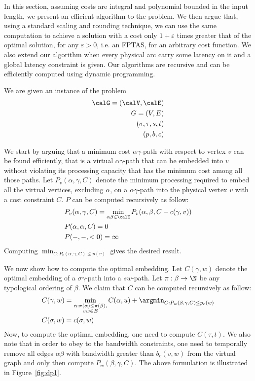 In this section, 
assuming costs are integral and polynomial bounded in the input length,
we present an efficient algorithm to the \VPN{} problem.
We then argue that, using a standard scaling and rounding technique, we can use
the same computation to achieve a solution with a cost only
$1 + \varepsilon$ times greater that of the optimal solution, for any
$\varepsilon > 0$, i.e. an FPTAS, for an arbitrary cost function.
We also extend our algorithm when every physical arc carry some latency on it
and a global latency constraint is given.
Our algorithms are recursive and can be efficiently computed using dynamic
programming.

We are given an instance of the \VPN{} problem 
\begin{align*}
\calG = (\calV, \calE)		\\
G = (V, E)		\\
(\sigma , \tau , s, t)	\\
(p, b, c)
\end{align*}

We start by arguing that a minimum cost 
$\alpha \gamma $-path with respect to vertex $v$ can be
found efficiently, that is a virtual $\alpha \gamma $-path that can be embedded 
into $v$ without violating its processing capacity that has the minimum cost
among all those paths.
Let $P_{v}(\alpha ,\gamma , C)$ 
denote the minimum processing required to embed all the virtual vertices, excluding $\alpha $, on a $\alpha \gamma $-path into the physical
vertex $v$ with a cost constraint $C$.
$P$ can be computed recursively as follow:
\begin{align*}
&P_{v}(\alpha , \gamma , C) = 
\min_{\alpha \beta  \in \calE} P_{v}(\alpha , \beta , C - c(\gamma , v))
\\
&P(\alpha , \alpha , C) = 0
\\
&P(-, -, <0) = \infty
\end{align*}
Computing $\min_{C : P_v(\alpha, \gamma, C) \leq p(v)}$ gives the desired
result.
 
We now show how to compute the optimal embedding.
Let $C(\gamma , w)$ denote the
optimal embedding of a $\sigma \gamma $-path into a $sw$-path.
Let $\pi:\beta  \to \N$ be any typological ordering of $\beta $. 
We claim that $C$ can be computed recursively as follow:
\begin{align*}
&C(\gamma , w) = 
\min_{\substack{
\alpha  : \pi(\alpha ) \leq \pi(\beta ), 
\\
vw \in E
}}
C(\alpha , u)
+
\argmin_{C : P_{w}(\beta , \gamma , C) \leq p_c(w)}
\\
&C(\sigma , w) = c(\sigma , w)
\end{align*}
Now, to compute the optimal embedding, one need to compute $C(\tau , t)$. 
We also note that in order to obey to the bandwidth constraints, 
one need to temporally remove all edges $\alpha \beta $ with bandwidth greater than
$b_c(v, w)$ from the virtual graph and only then compute $P_{w}(\beta , \gamma , C)$.
The above formulation is illustrated in Figure~\ref{fig:dp1}.

